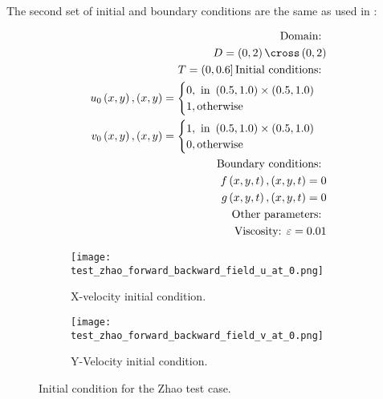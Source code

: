 \paragraph*{}

The second set of initial and boundary conditions are the same as used in \citet{zhao2011new}:

\begin{equation}
\begin{split}
\text{Domain: } \\
D = \left(0,2\right) \cross \left(0,2\right) \\
T = \left(0, 0.6\right]
\text{Initial conditions: } \\
u_0\left(x, y\right), \left(x, y\right) = \begin{cases}
0, \text{ in } \left(0.5, 1.0\right) \times \left(0.5, 1.0\right) \\
1, \text{otherwise}
\end{cases}
\\
v_0\left(x, y\right), \left(x, y\right) =  \begin{cases}
1, \text{ in } \left(0.5, 1.0\right) \times \left(0.5, 1.0\right) \\
0, \text{otherwise}
\end{cases}
\\
\text{Boundary conditions: } \\
f\left(x, y, t\right), \left(x, y, t\right) = 0 \\
g\left(x, y, t\right), \left(x, y, t\right) = 0 \\
\text{Other parameters: } \\
\text{Viscosity: } \varepsilon = 0.01
\end{split}
\end{equation}

\begin{figure}
\centering
\begin{subfigure}{.5\textwidth}
  \centering
  \texttt{[image: test\_zhao\_forward\_backward\_field\_u\_at\_0.png]}
  \caption{X-velocity initial condition.}
  \label{fig:zhao_ic1}
\end{subfigure}%
\begin{subfigure}{.5\textwidth}
  \centering
  \texttt{[image: test\_zhao\_forward\_backward\_field\_v\_at\_0.png]}
  \caption{Y-Velocity initial condition.}
  \label{fig:zhao_ic2}
\end{subfigure}
\caption{Initial condition for the Zhao test case.}
\label{fig:zhao_ic}
\end{figure}

